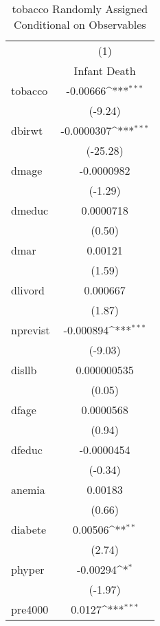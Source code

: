 {
\def\sym#1{\ifmmode^{#1}\else\(^{#1}\)\fi}
\begin{longtable}{l*{1}{c}}
\caption{tobacco Randomly Assigned Conditional on Observables\label{i1}}\\
\hline\hline\endfirsthead\hline\endhead\hline\endfoot\endlastfoot
            &\multicolumn{1}{c}{(1)}\\
            &\multicolumn{1}{c}{Infant Death}\\
\hline
tobacco     &    -0.00666\sym{***}\\
            &     (-9.24)         \\
[1em]
dbirwt      &  -0.0000307\sym{***}\\
            &    (-25.28)         \\
[1em]
dmage       &  -0.0000982         \\
            &     (-1.29)         \\
[1em]
dmeduc      &   0.0000718         \\
            &      (0.50)         \\
[1em]
dmar        &     0.00121         \\
            &      (1.59)         \\
[1em]
dlivord     &    0.000667         \\
            &      (1.87)         \\
[1em]
nprevist    &   -0.000894\sym{***}\\
            &     (-9.03)         \\
[1em]
disllb      & 0.000000535         \\
            &      (0.05)         \\
[1em]
dfage       &   0.0000568         \\
            &      (0.94)         \\
[1em]
dfeduc      &  -0.0000454         \\
            &     (-0.34)         \\
[1em]
anemia      &     0.00183         \\
            &      (0.66)         \\
[1em]
diabete     &     0.00506\sym{**} \\
            &      (2.74)         \\
[1em]
phyper      &    -0.00294\sym{*}  \\
            &     (-1.97)         \\
[1em]
pre4000     &      0.0127\sym{***}\\

\end{longtable}}
